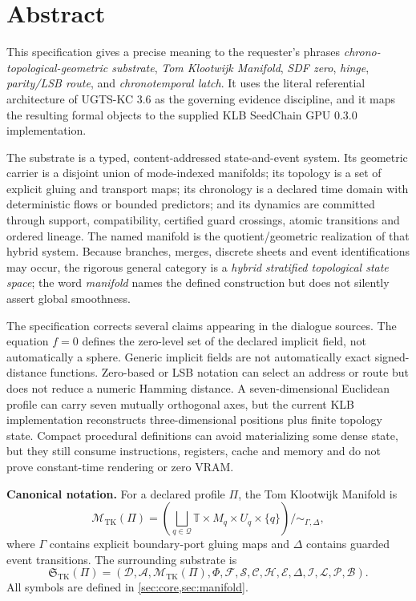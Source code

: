 \documentclass[10pt,a4paper]{article}
\newcommand{\TKM}{\mathcal{M}_{\mathrm{TK}}}
\newcommand{\TKSub}{\mathfrak{S}_{\mathrm{TK}}}
\newcommand{\Time}{\mathbb{T}}
\begin{document}
\setcounter{page}{1}

\section*{Abstract}

This specification gives a precise meaning to the requester’s phrases \emph{chrono-topological-geometric substrate}, \emph{Tom Klootwijk Manifold}, \emph{SDF zero}, \emph{hinge}, \emph{parity/LSB route}, and \emph{chronotemporal latch}. It uses the literal referential architecture of UGTS-KC 3.6 as the governing evidence discipline, and it maps the resulting formal objects to the supplied KLB SeedChain GPU 0.3.0 implementation.

The substrate is a typed, content-addressed state-and-event system. Its geometric carrier is a disjoint union of mode-indexed manifolds; its topology is a set of explicit gluing and transport maps; its chronology is a declared time domain with deterministic flows or bounded predictors; and its dynamics are committed through support, compatibility, certified guard crossings, atomic transitions and ordered lineage. The named manifold is the quotient/geometric realization of that hybrid system. Because branches, merges, discrete sheets and event identifications may occur, the rigorous general category is a \emph{hybrid stratified topological state space}; the word \emph{manifold} names the defined construction but does not silently assert global smoothness.

The specification corrects several claims appearing in the dialogue sources. The equation \(f=0\) defines the zero-level set of the declared implicit field, not automatically a sphere. Generic implicit fields are not automatically exact signed-distance functions. Zero-based or LSB notation can select an address or route but does not reduce a numeric Hamming distance. A seven-dimensional Euclidean profile can carry seven mutually orthogonal axes, but the current KLB implementation reconstructs three-dimensional positions plus finite topology state. Compact procedural definitions can avoid materializing some dense state, but they still consume instructions, registers, cache and memory and do not prove constant-time rendering or zero VRAM.

\begin{decisionbox}
\textbf{Canonical notation.}
For a declared profile \(\Pi\), the Tom Klootwijk Manifold is
\[
\TKM(\Pi)
=\left(\bigsqcup_{q\in\mathcal Q}\Time\times M_q\times U_q\times\{q\}\right)\big/\!\sim_{\Gamma,\Delta},
\]
where \(\Gamma\) contains explicit boundary-port gluing maps and \(\Delta\) contains guarded event transitions. The surrounding substrate is
\[
\TKSub(\Pi)=
(\mathcal D,\mathcal A,\TKM(\Pi),\Phi,\mathcal F,\mathcal S,\mathcal C,\mathcal H,
\mathcal E,\Delta,\mathcal I,\mathcal L,\mathcal P,\mathcal B).
\]
All symbols are defined in \cref{sec:core,sec:manifold}.
\end{decisionbox}
\end{document}
